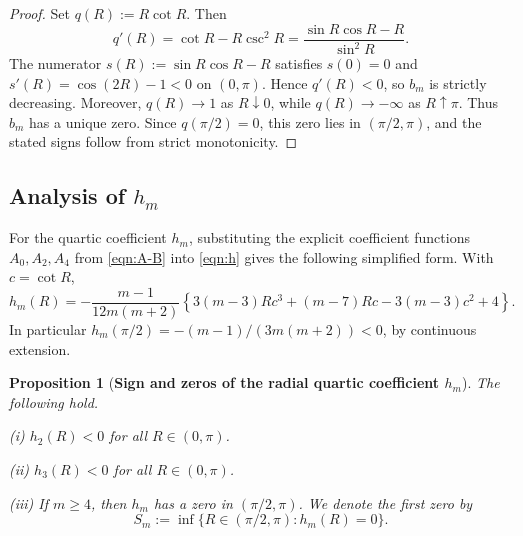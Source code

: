 \documentclass{amsart}
\newtheorem{proposition}[theorem]{Proposition}
\theoremstyle{definition}
\theoremstyle{remark}
\newcommand\0{\boldsymbol{0}}
\begin{document}
\begin{proof}
Set \(q(R):=R\cot R\). Then
\[
    q'(R)=\cot R-R\csc^2R=\frac{\sin R\cos R-R}{\sin^2R}.
\]
The numerator \(s(R):=\sin R\cos R-R\) satisfies \(s(0)=0\) and
\(s'(R)=\cos(2R)-1<0\) on \((0,\pi)\). Hence \(q'(R)<0\), so \(b_m\) is strictly decreasing.
Moreover, \(q(R)\to1\) as \(R\downarrow0\), while \(q(R)\to-\infty\) as \(R\uparrow\pi\).
Thus \(b_m\) has a unique zero. Since \(q(\pi/2)=0\), this zero lies in \((\pi/2,\pi)\), and the
stated signs follow from strict monotonicity.
\end{proof}
\subsection{\textbf{Analysis of $h_m$}}

For the quartic coefficient \(h_m\), substituting the explicit coefficient functions \(A_0,A_2,A_4\)
from \eqref{eqn:A-B} into \eqref{eqn:h} gives the following simplified form. With \(c=\cot R\),
\begin{equation}
\label{eqn:h_m_simplified}
\boxed{
    h_m(R)=
    -\frac{m-1}{12m(m+2)}
    \left\{
    3(m-3)Rc^3+(m-7)Rc-3(m-3)c^2+4
    \right\}.
}
\end{equation}
In particular \(h_m(\pi/2)=-(m-1)/(3m(m+2))<0\), by continuous extension.

\begin{proposition}[\textbf{Sign and zeros of the radial quartic coefficient \(h_m\)}]
\label{prop:sign_h_m_2_3_and_zero_m_ge_4}
The following hold.

\emph{(i)} \(h_2(R)<0\) for all \(R\in(0,\pi)\).

\emph{(ii)} \(h_3(R)<0\) for all \(R\in(0,\pi)\).

\emph{(iii)} If \(m\ge4\), then \(h_m\) has a zero in \((\pi/2,\pi)\). We denote the first zero by
\begin{equation}\label{eqn:S_m}
     \boxed{
    S_m:=\inf\{R\in(\pi/2,\pi):h_m(R)=0\}.
    }
\end{equation}
   

\end{proposition}
\end{document}
